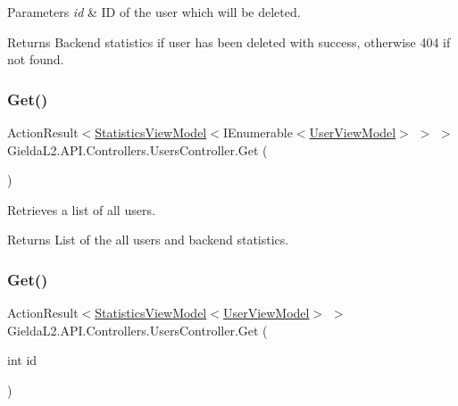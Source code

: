 \begin{DoxyParams}{Parameters}
{\em id} & ID of the user which will be deleted.\\
\hline
\end{DoxyParams}
\begin{DoxyReturn}{Returns}
Backend statistics if user has been deleted with success, otherwise 404 if not found.
\end{DoxyReturn}
\mbox{\label{class_gielda_l2_1_1_a_p_i_1_1_controllers_1_1_users_controller_a763e7ce08170f2681cb87b0a4cd2350a}} 
\subsubsection{\texorpdfstring{Get()}{Get()}\hspace{0.1cm}{\footnotesize\ttfamily [1/2]}}
{\footnotesize\ttfamily Action\+Result$<$\mbox{\hyperlink{class_gielda_l2_1_1_a_p_i_1_1_view_models_1_1_view_1_1_statistics_view_model}{Statistics\+View\+Model}}$<$I\+Enumerable$<$\mbox{\hyperlink{class_gielda_l2_1_1_a_p_i_1_1_view_models_1_1_view_1_1_user_view_model}{User\+View\+Model}}$>$ $>$ $>$ Gielda\+L2.\+A\+P\+I.\+Controllers.\+Users\+Controller.\+Get (\begin{DoxyParamCaption}{ }\end{DoxyParamCaption})}



Retrieves a list of all users. 

\begin{DoxyReturn}{Returns}
List of the all users and backend statistics.
\end{DoxyReturn}
\mbox{\label{class_gielda_l2_1_1_a_p_i_1_1_controllers_1_1_users_controller_a0957a53f250fa14681018808613610fe}} 
\subsubsection{\texorpdfstring{Get()}{Get()}\hspace{0.1cm}{\footnotesize\ttfamily [2/2]}}
{\footnotesize\ttfamily Action\+Result$<$\mbox{\hyperlink{class_gielda_l2_1_1_a_p_i_1_1_view_models_1_1_view_1_1_statistics_view_model}{Statistics\+View\+Model}}$<$\mbox{\hyperlink{class_gielda_l2_1_1_a_p_i_1_1_view_models_1_1_view_1_1_user_view_model}{User\+View\+Model}}$>$ $>$ Gielda\+L2.\+A\+P\+I.\+Controllers.\+Users\+Controller.\+Get (\begin{DoxyParamCaption}\item[{int}]{id }\end{DoxyParamCaption})}



